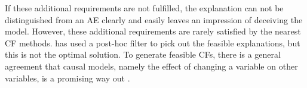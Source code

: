 If these additional requirements are not fulfilled, the explanation can not be distinguished from an AE clearly and easily leaves an impression of deceiving the model. However, these additional requirements are rarely satisfied by the nearest CF methods. \cite{DiCE} has used a post-hoc filter to pick out the feasible explanations, but this is not the optimal solution. To generate feasible CFs, there is a general agreement that causal models, namely the effect of changing a variable on other variables, is a promising way out \cite{algorithmicrecourse}.

